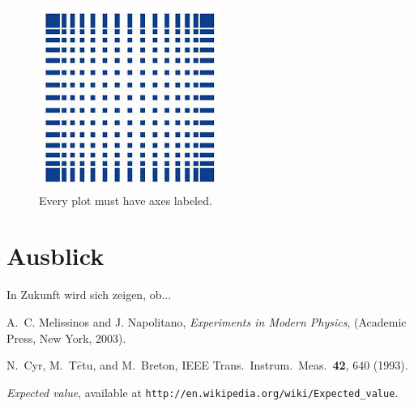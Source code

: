 \documentclass[letterpaper,12pt]{article}
\begin{document}
	\begin{figure}[ht] 
		\centering
		\includegraphics[width=0.5\columnwidth]{Images/hsMannheim.jpg}
		
		\caption{
			\label{fig:exp_plots}  
			Every plot must have axes labeled.
		}
	\end{figure}
	
	
	\section{Ausblick}
	In Zukunft wird sich zeigen, ob...
	
	
	\begin{thebibliography}{99}
		
		A.~C. Melissinos and J. Napolitano, \textit{Experiments in Modern Physics},
		(Academic Press, New York, 2003).
		
		N.\ Cyr, M.\ T$\hat{e}$tu, and M.\ Breton,
		IEEE Trans.\ Instrum.\ Meas.\ \textbf{42}, 640 (1993).
		
		 \emph{Expected value},  available at
		\texttt{http://en.wikipedia.org/wiki/Expected\_value}.
		
	\end{thebibliography}
	
	
\end{document}

